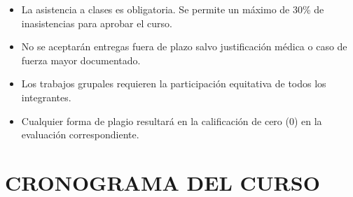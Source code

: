 \documentclass[12pt,a4paper]{article}
\begin{document}

\begin{tcolorbox}[colback=pucpRojo!5,colframe=pucpRojo,title=\textbf{Políticas del Curso}]
\begin{itemize}[leftmargin=*]
    \item La asistencia a clases es obligatoria. Se permite un máximo de 30\% de inasistencias para aprobar el curso.
    \item No se aceptarán entregas fuera de plazo salvo justificación médica o caso de fuerza mayor documentado.
    \item Los trabajos grupales requieren la participación equitativa de todos los integrantes.
    \item Cualquier forma de plagio resultará en la calificación de cero (0) en la evaluación correspondiente.
\end{itemize}
\end{tcolorbox}
\vspace{0.5cm}

\section{CRONOGRAMA DEL CURSO}
\end{document}
